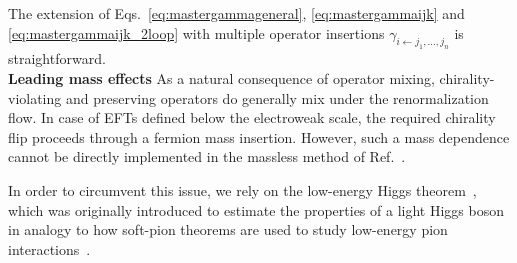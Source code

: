 \documentclass[prl,twocolumn,twoside,preprintnumbers,superscriptaddress, nofootinbib]{revtex4-2}
\begin{document}
%
%
%
The extension of Eqs.~\eqref{eq:mastergammageneral}, \eqref{eq:mastergammaijk} and \eqref{eq:mastergammaijk_2loop} 
with multiple operator insertions 
$\gamma_{i\leftarrow j_1, \dotsc, j_n}$ is straightforward.
\\

{\bf Leading mass effects}
As a natural consequence of operator mixing, chirality-violating and preserving operators do generally mix under the renormalization flow.
In case of EFTs defined below the electroweak scale, the required chirality flip proceeds through a fermion mass insertion. However, such a mass dependence cannot be directly implemented in the massless method of Ref.~\cite{Caron-Huot:2016cwu}. 

In order to circumvent this issue, we rely on the low-energy Higgs theorem~\cite{Ellis:1975ap,Shifman:1979eb}, which was originally introduced to estimate the properties of a light Higgs boson in analogy to how soft-pion theorems are used to study low-energy pion interactions~\cite{Adler:1964um,Cheung:2021yog,Balkin:2021dko,Bertuzzo:2023slg}. 
\end{document}
